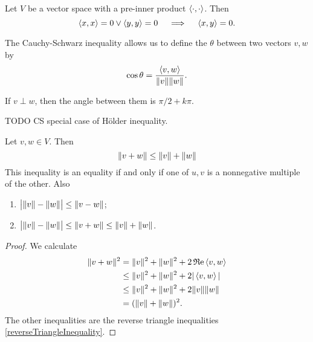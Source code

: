\begin{corollary} \label{preInnerProductCSBZero}
Let $V$ be a vector space with a pre-inner product $\left\langle \cdot,\cdot \right\rangle$. Then
\[ \left\langle x,x \right\rangle=0\lor\left\langle y,y \right\rangle=0 \quad\implies\quad \left\langle x,y \right\rangle = 0. \]
\end{corollary}
\begin{definition}
The Cauchy-Schwarz inequality allows us to define the  $\theta$ between two vectors $v,w$ by
\[ \cos\theta = \frac{\left\langle v,w \right\rangle}{\lVert v\rVert\lVert w\rVert}.\]
\end{definition}
\begin{lemma}
If $v\perp w$, then the angle between them is $\pi/2 + k\pi$.
\end{lemma}

TODO CS special case of Hölder inequality.

\begin{theorem}
Let $v,w\in V$. Then
\[ \lVert v+w\rVert \leq \lVert v\rVert+\lVert w\rVert \]
This inequality is an equality if and only if one of $u,v$ is a nonnegative multiple of the other. Also
\begin{enumerate}
\item $\big|\lVert v\rVert-\lVert w\rVert\big|\leq \lVert v-w\rVert$;
\item $\big|\lVert v\rVert-\lVert w\rVert\big| \leq \lVert v+w\rVert \leq \lVert v\rVert+\lVert w\rVert$.
\end{enumerate}
\end{theorem}
\begin{proof}
We calculate
\begin{align*}
\lVert v+w\rVert^2 &= \lVert v\rVert^2+\lVert w\rVert^2+2\operatorname{\mathfrak{R}e}\left\langle v,w \right\rangle \\
&\leq \lVert v\rVert^2+\lVert w\rVert^2+2|\left\langle v,w \right\rangle| \\
&\leq \lVert v\rVert^2+\lVert w\rVert^2+2\lVert v\rVert\lVert w\rVert \\
&= (\lVert v\rVert+\lVert w\rVert)^2.
\end{align*}
The other inequalities are the reverse triangle inequalities \ref{reverseTriangleInequality}.
\end{proof}

